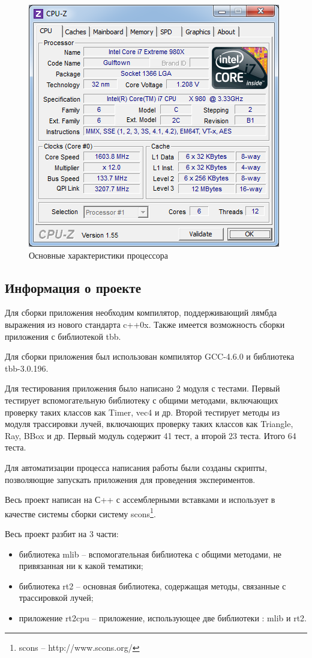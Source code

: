 \documentclass[12pt, a4paper, utf8]{article}
\begin{document}
\begin{figure}[h]
\centering
\includegraphics[scale=1]{imgs/cpu-z.png}
\caption{Основные характеристики процессора}\label{fig:cpuz}
\end{figure}

\subsection{Информация о проекте}

Для сборки приложения необходим компилятор, поддерживающий лямбда выражения из нового стандарта c++0x. Также имеется возможность сборки приложения с библиотекой tbb. 

Для сборки приложения был использован компилятор GCC-4.6.0 и библиотека tbb-3.0.196.

Для тестирования приложения было написано 2 модуля с тестами. Первый тестирует вспомогательную библиотеку с общими методами, включающих проверку таких классов как Timer, vec4 и др. Второй тестирует методы из модуля трассировки лучей, включающих проверку таких классов как Triangle, Ray, BBox и др. Первый модуль содержит 41 тест, а второй 23 теста. Итого 64 теста.

Для автоматизации процесса написания работы были созданы скрипты, позволяющие запускать приложения для проведения экспериментов.

Весь проект написан на С++ с ассемблерными вставками и использует в качестве системы сборки систему scons\footnote{scons -- http://www.scons.org/}.

\noindent 
Весь проект разбит на 3 части:
\begin{itemize}
\item библиотека mlib -- вспомогательная библиотека с общими методами, не привязанная ни к какой тематики;
\item библиотека rt2 -- основная библиотека, содержащая методы, связанные с трассировкой лучей;
\item приложение rt2cpu -- приложение, использующее две библиотеки : mlib и rt2.
\end{itemize}
\end{document}
